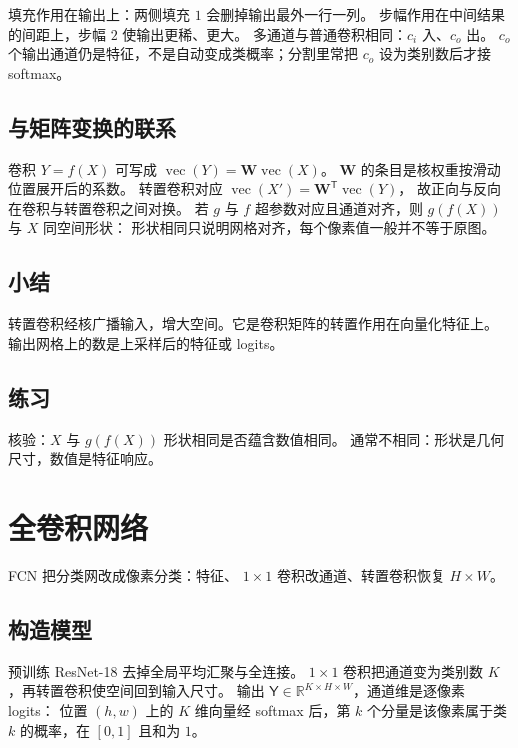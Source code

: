 填充作用在输出上：两侧填充 $1$ 会删掉输出最外一行一列。
步幅作用在中间结果的间距上，步幅 $2$ 使输出更稀、更大。
多通道与普通卷积相同：$c_i$ 入、$c_o$ 出。
$c_o$ 个输出通道仍是特征，不是自动变成类概率；分割里常把 $c_o$ 设为类别数后才接 softmax。

\subsection{与矩阵变换的联系}

卷积 $Y=f(X)$ 可写成 $\operatorname{vec}(Y)=\bm{W}\operatorname{vec}(X)$。
$\bm{W}$ 的条目是核权重按滑动位置展开后的系数。
转置卷积对应 $\operatorname{vec}(X')=\bm{W}^{\mathsf T}\operatorname{vec}(Y)$，
故正向与反向在卷积与转置卷积之间对换。
若 $g$ 与 $f$ 超参数对应且通道对齐，则 $g(f(X))$ 与 $X$ 同空间形状：
形状相同只说明网格对齐，每个像素值一般并不等于原图。

\subsection{小结}

转置卷积经核广播输入，增大空间。它是卷积矩阵的转置作用在向量化特征上。
输出网格上的数是上采样后的特征或 logits。

\subsection{练习}

核验：$X$ 与 $g(f(X))$ 形状相同是否蕴含数值相同。
通常不相同：形状是几何尺寸，数值是特征响应。

\section{全卷积网络}



FCN 把分类网改成像素分类：特征、 $1\times 1$ 卷积改通道、转置卷积恢复 $H\times W$。

\subsection{构造模型}

预训练 ResNet-18 去掉全局平均汇聚与全连接。
$1\times 1$ 卷积把通道变为类别数 $K$，再转置卷积使空间回到输入尺寸。
输出 $\hat{\mathsf{Y}}\in\mathbb{R}^{K\times H\times W}$，通道维是逐像素 logits：
位置 $(h,w)$ 上的 $K$ 维向量经 softmax 后，第 $k$ 个分量是该像素属于类 $k$ 的概率，在 $[0,1]$ 且和为 $1$。

